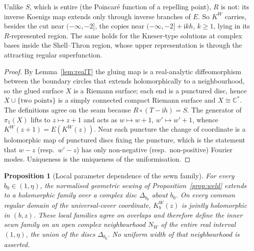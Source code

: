 \documentclass[11pt]{amsart}
\newtheorem{proposition}[theorem]{Proposition}
\theoremstyle{definition}
\newcommand{\Rr}{R}
\newcommand{\Kk}{K}
\newcommand{\ii}{\mathrm{i}}
\begin{document}
\noindent
Unlike $S$, which is entire (the Poincar\'e function of a repelling point),
$\Rr$ is not: its inverse Koenigs map extends only through inverse branches of
$E$.  So $\Kk^W$ carries, besides the cut near $(-\infty,-2]$, the copies
near $(-\infty,-2]+\ii kh$, $k\ge1$, lying in its $\Rr$-represented region.
The same holds for the Kneser-type solutions at complex bases inside the
Shell--Thron region, whose upper representation is through the attracting
regular superfunction.

\begin{proof}
By Lemma~\ref{lem:realT} the gluing map is a real-analytic diffeomorphism
between the boundary circles that extends holomorphically to a neighbourhood,
so the glued surface $X$ is a Riemann surface; each end is a punctured disc,
hence $X\cup\{\text{two points}\}$ is a simply connected compact Riemann
surface and $X\cong\mathbb C^*$.  The definitions agree on the seam because
$\Rr\circ(T-\ii h)=S$.  The generator of $\pi_1(X)$ lifts to $z\mapsto z+1$
and acts as $w\mapsto w+1$, $w'\mapsto w'+1$, whence
$\Kk^W(z+1)=E(\Kk^W(z))$.  Near each puncture the change of coordinate is a
holomorphic map of punctured discs fixing the puncture, which is the
statement that $w-z$ (resp.\ $w'-z$) has only non-negative (resp.\
non-positive) Fourier modes.  Uniqueness is the uniqueness of the uniformisation.
\end{proof}

\begin{proposition}[Local parameter dependence of the sewn family]
\label{prop:weld-parameter}
For every $b_0\in(1,\eta)$, the normalised geometric sewing of
Proposition~\ref{prop:weld} extends to a holomorphic family over a complex
disc $\Delta_{b_0}$ about $b_0$.  On every common regular domain of the
universal-cover coordinate, $\Kk_b^W(z)$ is jointly holomorphic in $(b,z)$.
These local families agree on overlaps and therefore define the inner sewn
family on an open complex neighbourhood $N_W$ of the entire real interval
$(1,\eta)$, the union of the discs $\Delta_{b_0}$.  No uniform width of that
neighbourhood is asserted.
\end{proposition}
\end{document}
